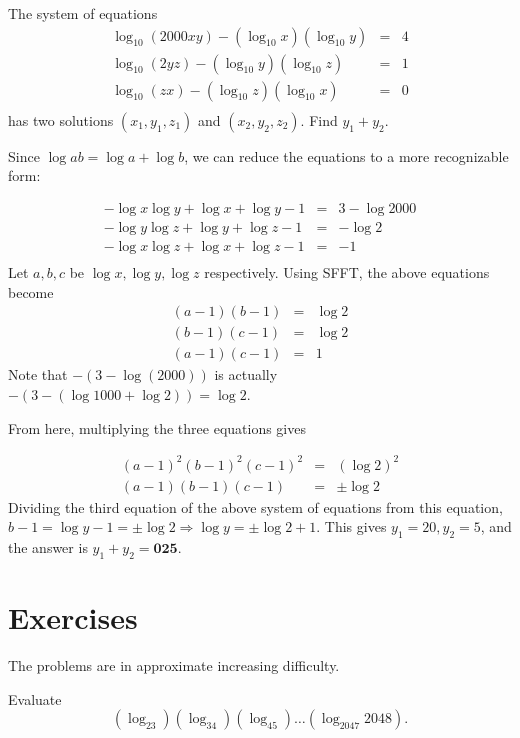 \documentclass[sexy]{scrartcl}
\newcommand{\ansbold}[1]{\mathbf{#1}}
\begin{document}
\begin{example}[AIME I 2000/9]
The system of equations\begin{eqnarray*}\log_{10}(2000xy) - (\log_{10}x)(\log_{10}y) & = & 4 \\ \log_{10}(2yz) - (\log_{10}y)(\log_{10}z) & = & 1 \\ \log_{10}(zx) - (\log_{10}z)(\log_{10}x) & = & 0 \\ \end{eqnarray*}
has two solutions $(x_{1},y_{1},z_{1})$ and $(x_{2},y_{2},z_{2})$. Find $y_{1} + y_{2}$.
\end{example}

\begin{soln}
Since $\log ab = \log a + \log b$, we can reduce the equations to a more recognizable form:

\begin{eqnarray*} -\log x \log y + \log x + \log y - 1 &=& 3 - \log 2000\\ -\log y \log z + \log y + \log z - 1 &=& - \log 2\\ -\log x \log z + \log x + \log z - 1 &=& -1\\ \end{eqnarray*}
Let $a,b,c$ be $\log x, \log y, \log z$ respectively. Using SFFT, the above equations become 
\begin{eqnarray*}(a - 1)(b - 1) &=& \log 2 \\ (b-1)(c-1) &=& \log 2 \\ (a-1)(c-1) &=& 1  \end{eqnarray*}
Note that $-(3-\log(2000))$ is actually $-(3-(\log 1000 + \log2)) = \log 2$.

From here, multiplying the three equations gives

\begin{eqnarray*}(a-1)^2(b-1)^2(c-1)^2 &=& (\log 2)^2\\ (a-1)(b-1)(c-1) &=& \pm\log 2\end{eqnarray*}
Dividing the third equation of the above system of equations from this equation, $b-1 = \log y - 1 = \pm\log 2 \Longrightarrow \log y = \pm \log 2 + 1$. This gives $y_1 = 20, y_2 = 5$, and the answer is $y_1 + y_2 = \ansbold{025}$.
\end{soln}

\section{Exercises}
The problems are in approximate increasing difficulty. 
\begin{problem}
Evaluate
\[(\log_23)(\log_34)(\log_45)\dots(\log_{2047}2048).\]
\end{problem} 
\end{document}
